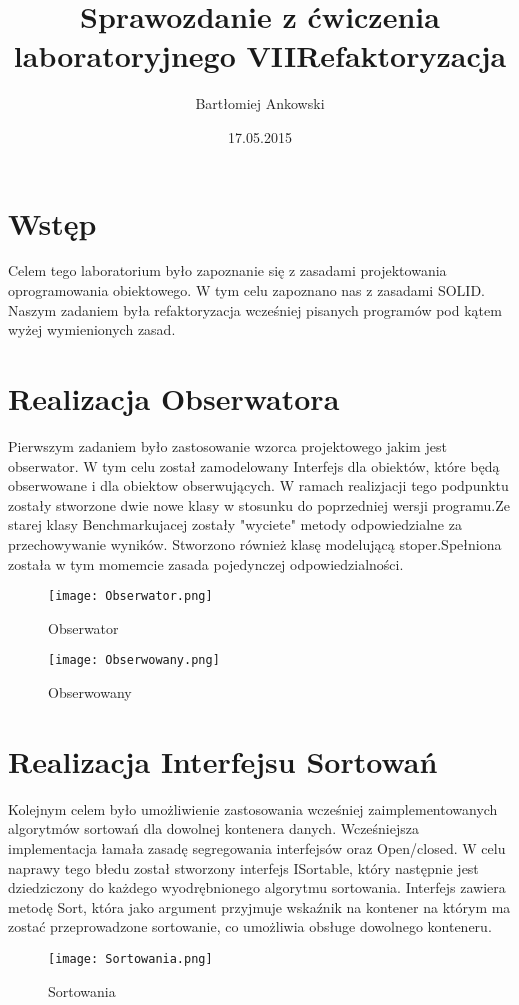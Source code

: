 \documentclass[12pt,a4paper,titlepage]{article}
\title{Sprawozdanie z ćwiczenia laboratoryjnego VII\newline Refaktoryzacja}
\date{17.05.2015}
\author{Bartłomiej Ankowski}
\begin{document}
\maketitle
\pagestyle{empty}
\tableofcontents
\section{Wstęp}
Celem tego laboratorium było zapoznanie się z zasadami projektowania oprogramowania obiektowego.
W tym celu zapoznano nas z zasadami SOLID. Naszym zadaniem była refaktoryzacja wcześniej pisanych programów
pod kątem wyżej wymienionych zasad.
\section{Realizacja Obserwatora}
Pierwszym zadaniem było zastosowanie wzorca projektowego jakim jest obserwator.
W tym celu został zamodelowany Interfejs dla obiektów, które będą obserwowane i dla obiektow obserwujących.
W ramach realizjacji tego podpunktu zostały stworzone dwie nowe klasy w stosunku do poprzedniej wersji programu.Ze starej klasy Benchmarkujacej zostały "wyciete" metody odpowiedzialne za przechowywanie wyników.
Stworzono również klasę modelującą stoper.Spełniona została w tym momemcie zasada pojedynczej odpowiedzialności.
\begin{figure}[!htbp]
\begin{center}
\texttt{[image: Obserwator.png]}
\caption{Obserwator}
\end{center}
\end{figure}
\begin{figure}[!htbp]
\begin{center}
\texttt{[image: Obserwowany.png]}
\caption{Obserwowany}
\end{center}
\end{figure}
\section{Realizacja Interfejsu Sortowań}
Kolejnym celem było umożliwienie zastosowania wcześniej zaimplementowanych algorytmów sortowań dla 
dowolnej kontenera danych. Wcześniejsza implementacja łamała zasadę segregowania interfejsów oraz Open/closed. W celu naprawy tego błedu został stworzony interfejs ISortable, który następnie jest dziedziczony do każdego wyodrębnionego algorytmu sortowania.
Interfejs zawiera metodę Sort, która jako argument przyjmuje wskaźnik na kontener na którym ma zostać przeprowadzone sortowanie, co umożliwia obsługe dowolnego konteneru.
\begin{figure}[!htbp]
\begin{center}
\texttt{[image: Sortowania.png]}
\caption{Sortowania}
\end{center}
\end{figure}
\end{document}
